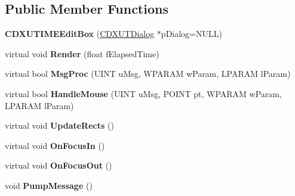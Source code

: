 \subsection*{Public Member Functions}
\begin{DoxyCompactItemize}
\item 
\hypertarget{class_c_d_x_u_t_i_m_e_edit_box_a4fe495517cf6a25bee93336af1e8a7c8}{{\bfseries C\+D\+X\+U\+T\+I\+M\+E\+Edit\+Box} (\hyperlink{class_c_d_x_u_t_dialog}{C\+D\+X\+U\+T\+Dialog} $\ast$p\+Dialog=N\+U\+L\+L)}\label{class_c_d_x_u_t_i_m_e_edit_box_a4fe495517cf6a25bee93336af1e8a7c8}

\item 
\hypertarget{class_c_d_x_u_t_i_m_e_edit_box_ade5fb33b34d3dd3afa4a69a19e8b90a0}{virtual void {\bfseries Render} (float f\+Elapsed\+Time)}\label{class_c_d_x_u_t_i_m_e_edit_box_ade5fb33b34d3dd3afa4a69a19e8b90a0}

\item 
\hypertarget{class_c_d_x_u_t_i_m_e_edit_box_ac656a213385fb3245938f0297d58d0de}{virtual bool {\bfseries Msg\+Proc} (U\+I\+N\+T u\+Msg, W\+P\+A\+R\+A\+M w\+Param, L\+P\+A\+R\+A\+M l\+Param)}\label{class_c_d_x_u_t_i_m_e_edit_box_ac656a213385fb3245938f0297d58d0de}

\item 
\hypertarget{class_c_d_x_u_t_i_m_e_edit_box_a02795ef1096e7a276afdc501c606eab9}{virtual bool {\bfseries Handle\+Mouse} (U\+I\+N\+T u\+Msg, P\+O\+I\+N\+T pt, W\+P\+A\+R\+A\+M w\+Param, L\+P\+A\+R\+A\+M l\+Param)}\label{class_c_d_x_u_t_i_m_e_edit_box_a02795ef1096e7a276afdc501c606eab9}

\item 
\hypertarget{class_c_d_x_u_t_i_m_e_edit_box_a5b000e31365cfc36ea9c01cce29d1656}{virtual void {\bfseries Update\+Rects} ()}\label{class_c_d_x_u_t_i_m_e_edit_box_a5b000e31365cfc36ea9c01cce29d1656}

\item 
\hypertarget{class_c_d_x_u_t_i_m_e_edit_box_a6f3ada4a18eb810420806d5112fd7de6}{virtual void {\bfseries On\+Focus\+In} ()}\label{class_c_d_x_u_t_i_m_e_edit_box_a6f3ada4a18eb810420806d5112fd7de6}

\item 
\hypertarget{class_c_d_x_u_t_i_m_e_edit_box_a32592319ff970787b0cfa1c59b61f4d6}{virtual void {\bfseries On\+Focus\+Out} ()}\label{class_c_d_x_u_t_i_m_e_edit_box_a32592319ff970787b0cfa1c59b61f4d6}

\item 
\hypertarget{class_c_d_x_u_t_i_m_e_edit_box_a3abd5952d806d278c1778c2b27327d25}{void {\bfseries Pump\+Message} ()}\label{class_c_d_x_u_t_i_m_e_edit_box_a3abd5952d806d278c1778c2b27327d25}


\end{DoxyCompactItemize}
